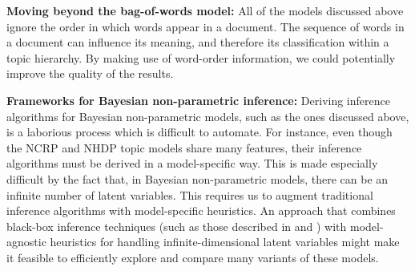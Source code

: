 \documentclass{article}
\begin{document}
\textbf{Moving beyond the bag-of-words model:}
All of the models discussed above ignore the order in which words appear in a document.
The sequence of words in a document can influence its meaning, and therefore its classification within a topic hierarchy.
By making use of word-order information, we could potentially improve the quality of the results.

\textbf{Frameworks for Bayesian non-parametric inference:}
Deriving inference algorithms for Bayesian non-parametric models, such as the ones discussed above, is a laborious process which is difficult to automate.
For instance, even though the NCRP and NHDP topic models share many features, their inference algorithms must be derived in a model-specific way.
This is made especially difficult by the fact that, in Bayesian non-parametric models, there can be an infinite number of latent variables.
This requires us to augment traditional inference algorithms with model-specific heuristics.
An approach that combines black-box inference techniques (such as those described in \cite{ranganath2014blackbox} and \cite{ranganath2016operator}) with model-agnostic heuristics for handling infinite-dimensional latent variables might make it feasible to efficiently explore and compare many variants of these models.

\clearpage
\nocite{*}
%


\end{document}
